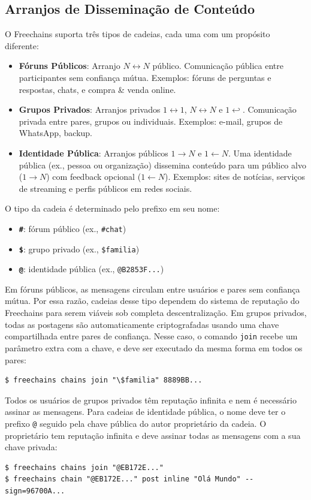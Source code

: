 \documentclass[12pt]{article}
\newcommand{\FC} {Freechains\xspace}
\newcommand{\Xon} {$1{\rightarrow}N$\xspace}
\newcommand{\Xno} {$1{\leftarrow}N$\xspace}
\newcommand{\Xnn} {$N{\leftrightarrow}N$\xspace}
\newcommand{\Xoo} {$1{\leftrightarrow}1$\xspace}
\newcommand{\Xo}  {$1{\hookleftarrow}$\xspace}
\begin{document}
\subsection{Arranjos de Disseminação de Conteúdo}

O \FC suporta três tipos de cadeias, cada uma com um propósito diferente:
%
\begin{itemize}
\item \textbf{Fóruns Públicos}:
    Arranjo \Xnn público.
    Comunicação pública entre participantes sem confiança mútua.
    Exemplos: fóruns de perguntas e respostas, chats, e compra \& venda online.
\item \textbf{Grupos Privados}:
    Arranjos privados \Xoo, \Xnn e \Xo.
    Comunicação privada entre pares, grupos ou individuais.
    Exemplos: e-mail, grupos de WhatsApp, backup.
\item \textbf{Identidade Pública}:
    Arranjos públicos \Xon e \Xno.
    Uma identidade pública (ex., pessoa ou organização) dissemina conteúdo para
    um público alvo (\Xon) com feedback opcional (\Xno).
    Exemplos: sites de notícias, serviços de streaming e perfis públicos em
    redes sociais.
\end{itemize}
%
O tipo da cadeia é determinado pelo prefixo em seu nome:
%
\begin{itemize}
    \item \textbf{\texttt{\#}}: fórum público (ex., \texttt{\#chat})
    \item \textbf{\texttt{\$}}: grupo privado (ex., \texttt{\$familia})
    \item \textbf{\texttt{@}}: identidade pública (ex., \texttt{@B2853F...})
\end{itemize}

Em fóruns públicos, as mensagens circulam entre usuários e pares sem confiança
mútua.
Por essa razão, cadeias desse tipo dependem do sistema de reputação do \FC para
serem viáveis sob completa descentralização.
%
Em grupos privados, todas as postagens são automaticamente criptografadas
usando uma chave compartilhada entre pares de confiança.
Nesse caso, o comando \texttt{join} recebe um parâmetro extra com a chave, e
deve ser executado da mesma forma em todos os pares:
%
{\footnotesize
\begin{verbatim}
$ freechains chains join "\$familia" 8889BB...
\end{verbatim}
}
%
Todos os usuários de grupos privados têm reputação infinita e nem é necessário
assinar as mensagens.
%
Para cadeias de identidade pública, o nome deve ter o prefixo \texttt{@}
seguido pela chave pública do autor proprietário da cadeia.
O proprietário tem reputação infinita e deve assinar todas as mensagens com a
sua chave privada:
%
{\footnotesize
\begin{verbatim}
$ freechains chains join "@EB172E..."
$ freechains chain "@EB172E..." post inline "Olá Mundo" --sign=96700A...
\end{verbatim}
}
\end{document}
